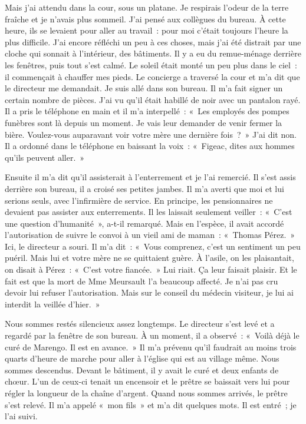 \documentclass[french,twoside]{book} %
\begin{document}
Mais j’ai attendu dans la cour, sous un platane. Je respirais l’odeur de la terre fraîche et je n’avais plus sommeil. J'ai pensé aux collègues du bureau. À cette heure, ils se levaient pour aller au travail : pour moi c’était toujours l’heure la plus difficile. J'ai encore réfléchi un peu à ces choses, mais j’ai été distrait par une cloche qui sonnait à l’intérieur, des bâtiments. Il y a eu du remue-ménage derrière les fenêtres, puis tout s’est calmé. Le soleil était monté un peu plus dans le ciel : il commençait à chauffer mes pieds. Le concierge a traversé la cour et m’a dit que le directeur me demandait. Je suis allé dans son bureau. Il m’a fait signer un certain nombre de pièces. J'ai vu qu’il était habillé de noir avec un pantalon rayé. Il a pris le téléphone en main et il m’a interpellé : « Les employés des pompes funèbres sont là depuis un moment. Je vais leur demander de venir fermer la bière. Voulez-vous auparavant voir votre mère une dernière fois ? » J'ai dit non. Il a ordonné dans le téléphone en baissant la voix : « Figeac, dites aux hommes qu’ils peuvent aller. »\par
Ensuite il m’a dit qu’il assisterait à l’enterrement et je l’ai remercié. Il s’est assis derrière son bureau, il a croisé ses petites jambes. Il m’a averti que moi et lui serions seuls, avec l’infirmière de service. En principe, les pensionnaires ne devaient pas assister aux enterrements. Il les laissait seulement veiller : « C'est une question d’humanité », a-t-il remarqué. Mais en l’espèce, il avait accordé l’autorisation de suivre le convoi à un vieil ami de maman : « Thomas Pérez. » Ici, le directeur a souri. Il m’a dit : « Vous comprenez, c’est un sentiment un peu puéril. Mais lui et votre mère ne se quittaient guère. À l’asile, on les plaisantait, on disait à Pérez : « C'est votre fiancée. » Lui riait. Ça leur faisait plaisir. Et le fait est que la mort de Mme Meursault l’a beaucoup affecté. Je n’ai pas cru devoir lui refuser l’autorisation. Mais sur le conseil du médecin visiteur, je lui ai interdit la veillée d’hier. »\par
Nous sommes restés silencieux assez longtemps. Le directeur s’est levé et a regardé par la fenêtre de son bureau. À un moment, il a observé : « Voilà déjà le curé de Marengo. Il est en avance. » Il m’a prévenu qu’il faudrait au moins trois quarts d’heure de marche pour aller à l’église qui est au village même. Nous sommes descendus. Devant le bâtiment, il y avait le curé et deux enfants de chœur. L'un de ceux-ci tenait un encensoir et le prêtre se baissait vers lui pour régler la longueur de la chaîne d’argent. Quand nous sommes arrivés, le prêtre s’est relevé. Il m’a appelé « mon fils » et m’a dit quelques mots. Il est entré ; je l’ai suivi.\par
\end{document}
